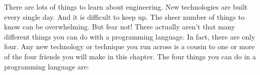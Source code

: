 \documentclass{amsart}
\begin{document}
There are lots of things to learn about engineering. New technologies are built every single day. And it is difficult to keep up. The sheer number of things to know can be overwhelming. But fear not! There actually aren't that many different things you can do with a programming language. In fact, there are only four. Any new technology or technique you run across is a cousin to one or more of the four friends you will make in this chapter. The four things you can do in a programming language are:
\end{document}
